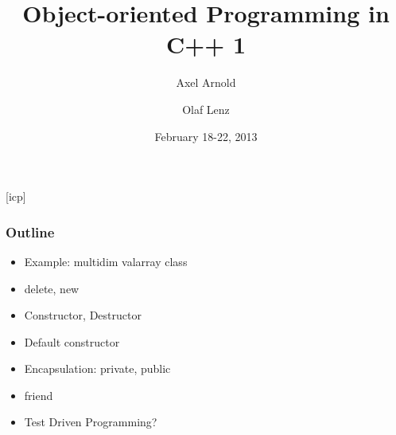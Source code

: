 \documentclass{slides}
\begin{document}
\graphicspath{{figures/}}

\title[Object-oriented Programming in C++ 1]{\Large Object-oriented
  Programming in C++ 1}

\author[A. Arnold and O. Lenz]{Axel Arnold \and Olaf Lenz} 
\date{February 18-22, 2013}

\begin{frame}
  \titlepage
\end {frame}
[icp]

\begin{frame}
  \frametitle{Outline}
  \begin{itemize}
  \item Example: multidim valarray class
  \item delete, new
  \item Constructor, Destructor
  \item Default constructor
  \item Encapsulation: private, public
  \item friend
  \item Test Driven Programming?
  \end{itemize}
\end{frame}
\end{document}
